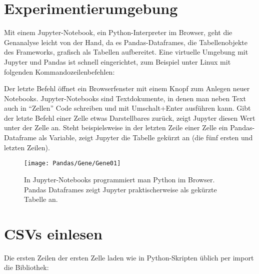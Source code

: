 \section{Experimentierumgebung}

Mit einem Jupyter-Notebook, ein Python-Interpreter im Browser, geht die Genanalyse leicht von der Hand, da es Pandas-Dataframes, die Tabellenobjekte des Frameworks, grafisch als Tabellen aufbereitet. Eine virtuelle Umgebung mit Jupyter und Pandas ist schnell eingerichtet, zum Beispiel unter Linux mit folgenden Kommandozeilenbefehlen:

\medskip
	






\medskip

Der letzte Befehl öffnet ein Browserfenster mit einem Knopf zum Anlegen neuer Notebooks. Jupyter-Notebooks sind Textdokumente, in denen man neben Text auch in ``Zellen'' Code schreiben und mit Umschalt+Enter ausführen kann. Gibt der letzte Befehl einer Zelle etwas Darstellbares zurück, zeigt Jupyter diesen Wert unter der Zelle an. Steht beispielsweise in der letzten Zeile einer Zelle ein Pandas-Dataframe als Variable, zeigt Jupyter die Tabelle gekürzt an (die fünf ersten und letzten Zeilen).

\begin{figure}

\begin{center}
	
  \texttt{[image: Pandas/Gene/Gene01]}
  
 \caption[Pandas Dataframes in Jupyter]{In Jupyter-Notebooks pro­grammiert man ­Python im ­Browser. Pandas Dataframes zeigt Jupyter praktischer­weise als gekürzte Tabelle an.}
\end{center} 
\end{figure}	

\section{CSVs einlesen}

Die ersten Zeilen der ersten Zelle laden wie in Python-Skripten üblich per import die Bibliothek:
	
